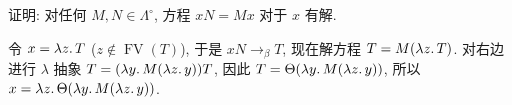 \begin{problem}
证明: 对任何 $M, N \in \Lambda^\circ$, 方程 $xN=Mx$ 对于 $x$ 有解.
\end{problem}

\begin{solution}
令 $x = \lambda {z}.\,{T}$ ($z \not\in \operatorname{FV}(T)$), 于是 $xN \to_\beta T$, 现在解方程 $T=M(\lambda {z}.\,{T})$. 对右边进行 $\lambda$ 抽象 $T = (\lambda {y}.\,{M(\lambda {z}.\,{y})})T$, 因此 $T = \Theta(\lambda {y}.\,{M(\lambda {z}.\,{y})})$, 所以 $x = \lambda {z}.\,{\Theta(\lambda {y}.\,{M(\lambda {z}.\,{y})})}$.
\end{solution}
